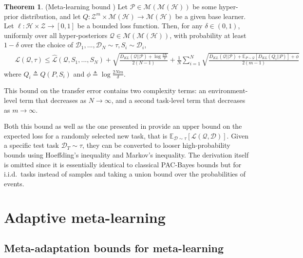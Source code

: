 \documentclass{article} %
\theoremstyle{definition}
\newtheorem{theorem}{Theorem}[section]
\newcommand{\Expect}[2]{\mathbb{E}_{#1}\left [#2 \right ]}
\begin{document}
\begin{theorem} (Meta-learning bound \citep{Amit2018}) \label{thm:meta-pb}
	Let $\mathcal{P}\in \mathcal{M}(\mathcal{M}(\mathcal{H}))$ be some hyper-prior distribution, and let $Q: \mathcal{Z}^m\times\mathcal{M}(\mathcal{H})\rightarrow \mathcal{M}(\mathcal{H})$ be a given base learner. Let $\ell: \mathcal{H}\times \mathcal{Z}\rightarrow [0, 1]$ be a bounded loss function.
	Then, for any $\delta \in (0,1)$, uniformly over all hyper-posteriors $\mathcal{Q}\in \mathcal{M}(\mathcal{M}(\mathcal{H}))$, with probability at least $1-\delta$ over the choice of $\mathcal{D}_1,...,\mathcal{D}_N\sim \tau, S_i\sim \mathcal{D}_i$, 
%	
	\begin{align*} 
	\begin{split}
	&\mathcal{L}(\mathcal{Q}, \tau) \leq \hat{\mathcal{L}}(\mathcal{Q}, S_1,...,S_N) 
	+\sqrt{\frac{D_{KL}(\mathcal{Q}||\mathcal{P})+\log\frac{2N}{\delta}}{2(N-1)}} 
	+\frac{1}{N}\sum_{i=1}^{N}\sqrt{\frac{D_{KL}(\mathcal{Q}||\mathcal{P})+\Expect{P\sim \mathcal{Q}}{D_{KL}(Q_i||P)}+\phi}{2(m-1)}}
	\end{split}
	\end{align*}
	where $Q_i\triangleq Q(P,S_i)$ and $\phi\triangleq \log\frac{2Nm}{\delta}$.
\end{theorem}

This bound on the transfer error contains two complexity terms: an environment-level term that decreases as $N\rightarrow \infty$, and a second task-level term that decreases as $m\rightarrow \infty$. 

Both this bound as well as the one presented in \cite{Rothfuss2020} provide an upper bound on the expected loss for a randomly selected new task, that is
$\Expect{\mathcal{D}\sim \tau}{\mathcal{L}(\mathcal{Q}, \mathcal{D})}$.
Given a specific test task $\mathcal{D}_T\sim \tau$, they can be converted to looser high-probability bounds using Hoeffding's inequality and Markov's inequality. The derivation itself is omitted since it is essentially identical to classical PAC-Bayes bounds but for i.i.d.\ tasks instead of samples and taking a union bound over the probabilities of events.

\section{Adaptive meta-learning}

\subsection{Meta-adaptation bounds for meta-learning} \label{sec:adapt-general}
\end{document}
